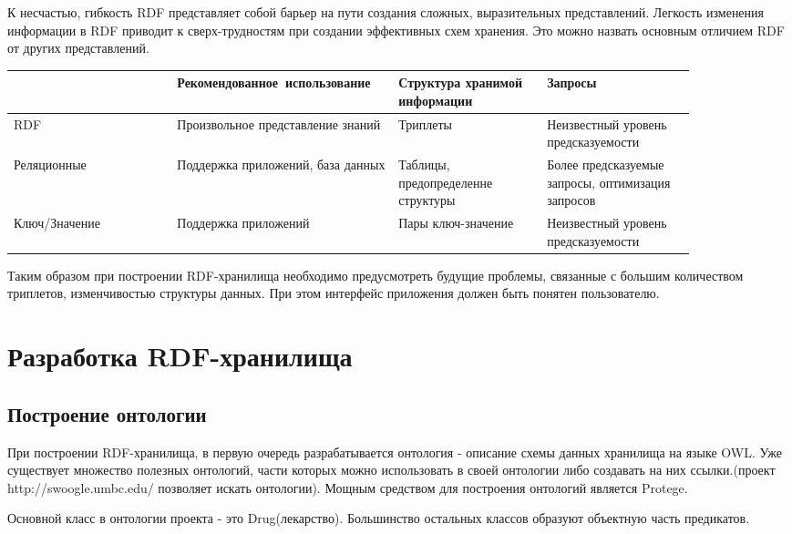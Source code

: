 \documentclass[specialist,subf,href,colorlinks=true
]{disser}
\begin{document}
К несчастью, гибкость RDF представляет собой барьер на пути создания сложных, выразительных представлений. Легкость изменения информации в RDF приводит к сверх-трудностям при создании эффективных схем хранения. Это можно назвать основным отличием RDF от других представлений.

\begin{tabular}{p{0.22\linewidth}|p{0.25\linewidth}|p{0.2\linewidth}|p{0.2\linewidth}}
\hline
& Рекомендованное\ использование & Структура хранимой информации & Запросы  \\
\hline
RDF & Произвольное представление знаний & Триплеты & Неизвестный уровень предсказуемости \\
\hline
Реляционные & Поддержка приложений, база данных & Таблицы, предопределенне структуры & Более предсказуемые запросы, оптимизация запросов \\
\hline
Ключ/Значение & Поддержка приложений& Пары ключ-значение & Неизвестный уровень предсказуемости \\
\hline
\end{tabular}

Таким образом при построении RDF-хранилища необходимо предусмотреть будущие проблемы, связанные с большим количеством триплетов, изменчивостью структуры данных. При этом интерфейс приложения должен быть понятен пользователю. 

\chapter{Разработка RDF-хранилища}

\section{Построение онтологии}
При построении RDF-хранилища, в первую очередь разрабатывается онтология - описание схемы данных хранилища на языке OWL. Уже существует множество полезных онтологий, части которых можно использовать в своей онтологии либо создавать на них ссылки.(проект http://swoogle.umbc.edu/ позволяет искать онтологии). Мощным средством для построения онтологий является Protege.

Основной класс в онтологии проекта - это Drug(лекарство). Большинство остальных классов образуют объектную часть предикатов.
\end{document}
